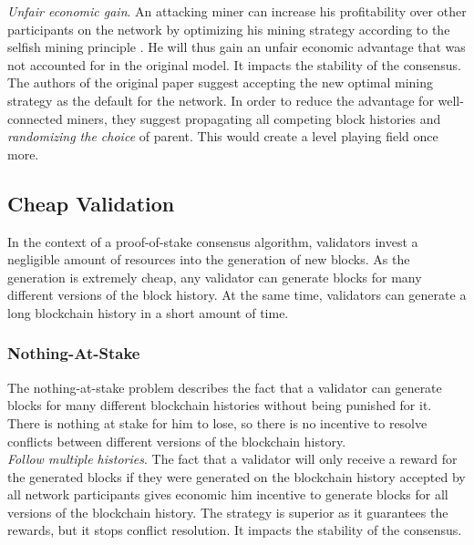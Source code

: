 \documentclass[12pt,a4paper]{article}
\begin{document}
\textit{Unfair economic gain}. An attacking miner can increase his profitability over other participants on the network by optimizing his mining strategy according to the selfish mining principle \cite{optimal}. He will thus gain an unfair economic advantage that was not accounted for in the original model. It impacts the stability of the \gls{consensus}.\\

The authors of the original paper suggest accepting the new optimal mining strategy as the default for the network. In order to reduce the advantage for well-connected miners, they suggest propagating all competing block histories and \textit{randomizing the choice} of parent. This would create a level playing field once more.\\

\subsection{Cheap Validation}

In the context of a proof-of-stake consensus algorithm, \glspl{validator} invest a negligible amount of resources into the generation of new \glspl{block}. As the generation is extremely cheap, any \gls{validator} can generate \glspl{block} for many different versions of the block history. At the same time, \glspl{validator} can generate a long blockchain history in a short amount of time.\\

\subsubsection{Nothing-At-Stake}

The nothing-at-stake problem describes the fact that a \gls{validator} can generate \glspl{block} for many different blockchain histories without being punished for it. There is nothing at stake for him to lose, so there is no incentive to resolve conflicts between different versions of the blockchain history.\\

\textit{Follow multiple histories}. The fact that a \gls{validator} will only receive a \gls{reward} for the generated \glspl{block} if they were generated on the blockchain history accepted by all network participants gives economic him incentive to generate blocks for all versions of the blockchain history. The strategy is superior as it guarantees the \glspl{reward}, but it stops conflict resolution. It impacts the stability of the \gls{consensus}.\\
\end{document}
